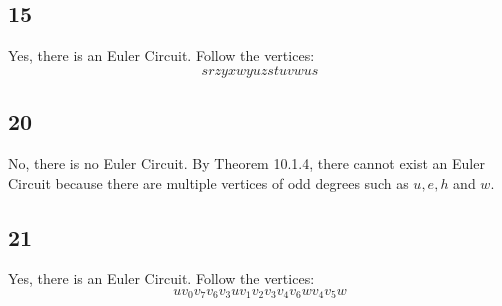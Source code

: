 \documentclass[12pt]{article}
\begin{document}
\subsection*{15}
Yes, there is an Euler Circuit. Follow the vertices:
$$s r z y x w y u z s t u v w u s$$
\subsection*{20}
No, there is no Euler Circuit. 
By Theorem 10.1.4, there cannot exist an Euler Circuit because there are multiple vertices of odd degrees such as $u, e, h$ and $w$.
\subsection*{21}
Yes, there is an Euler Circuit. Follow the vertices:
$$u v_0 v_7 v_6 v_3 u v_1 v_2 v_3 v_4 v_6 w v_4 v_5 w$$
\end{document}

